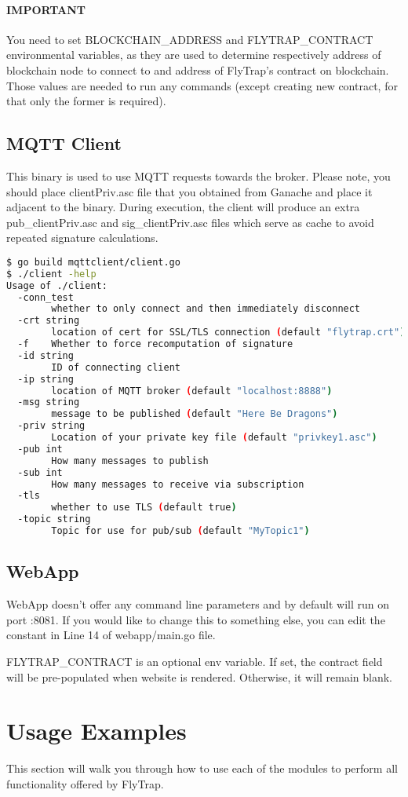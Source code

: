 \paragraph{IMPORTANT} You need to set BLOCKCHAIN\_ADDRESS and FLYTRAP\_CONTRACT environmental variables, as they are used to determine respectively address of blockchain node to connect to and address of FlyTrap's contract on blockchain. Those values are needed to run any commands (except creating new contract, for that only the former is required).
\subsection{MQTT Client}
This binary is used to use MQTT requests towards the broker. Please note, you should place clientPriv.asc file that you obtained from Ganache and place it adjacent to the binary. During execution, the client will produce an extra pub\_clientPriv.asc and sig\_clientPriv.asc files which serve as cache to avoid repeated signature calculations. 
\begin{lstlisting}[language=bash,breaklines=true]
$ go build mqttclient/client.go
$ ./client -help
Usage of ./client:
  -conn_test
    	whether to only connect and then immediately disconnect
  -crt string
    	location of cert for SSL/TLS connection (default "flytrap.crt")
  -f	Whether to force recomputation of signature
  -id string
    	ID of connecting client
  -ip string
    	location of MQTT broker (default "localhost:8888")
  -msg string
    	message to be published (default "Here Be Dragons")
  -priv string
    	Location of your private key file (default "privkey1.asc")
  -pub int
    	How many messages to publish
  -sub int
    	How many messages to receive via subscription
  -tls
    	whether to use TLS (default true)
  -topic string
    	Topic for use for pub/sub (default "MyTopic1")
\end{lstlisting}
\subsection{WebApp}
WebApp doesn't offer any command line parameters and by default will run on port :8081. If you would like to change this to something else, you can edit the constant in Line 14 of webapp/main.go file.

FLYTRAP\_CONTRACT is an optional env variable. If set, the contract field will be pre-populated when website is rendered. Otherwise, it will remain blank.
\section{Usage Examples}
This section will walk you through how to use each of the modules to perform all functionality offered by FlyTrap.
